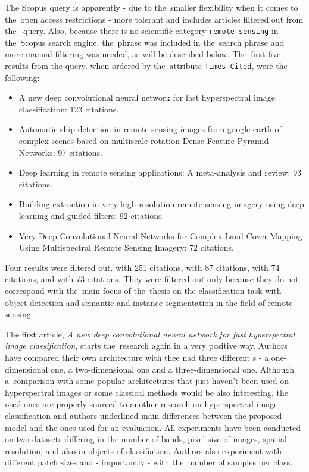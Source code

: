 \noindent The Scopus query is apparently - due to the~smaller flexibility when it comes to the~open access restrictions - more tolerant and includes articles filtered out from the~ query. Also, because there is no scientific category \verb|remote sensing| in the~Scopus search engine, the~phrase was included in the~search phrase and more manual filtering was needed, as will be described below. The~first five results from the query, when ordered by the~attribute \verb|Times Cited|, were the following:

\begin{itemize}
	\item A new deep convolutional neural network for fast hyperspectral image classification: 123 citations.  \cite{cnn-hs-class}
	\item Automatic ship detection in remote sensing images from google earth of complex scenes based on multiscale rotation Dense Feature Pyramid Networks: 97 citations. \cite{ship-rdfpn}
	\item Deep learning in remote sensing applications: A meta-analysis and review: 93 citations. \cite{dl-remote-sensing-review}
	\item Building extraction in very high resolution remote sensing imagery using deep learning and guided filters: 92 citations. \cite{vhr-building}
	\item Very Deep Convolutional Neural Networks for Complex Land Cover Mapping Using Multispectral Remote Sensing Imagery: 72 citations. \cite{very-deep-cnn-lc}
\end{itemize}

Four results were filtered out. \cite{dl-for-cv} with 251 citations, \cite{dl-lungs} with 87 citations, \cite{maoxian-landslide} with 74 citations, and \cite{state-of-the-art-dl} with 73 citations. They were filtered out only because they do not correspond with the~main focus of the~thesis on the classification task with object detection and semantic and instance segmentation in the field of remote sensing. 

The first article, \textit{A new deep convolutional neural network for fast hyperspectral image classification}, starts the~research again in a very positive way. Authors have compared their own architecture with thee  nad three different s - a one-dimensional one, a two-dimensional one and a three-dimensional one. Although a~comparison with some popular architectures that just haven't been used on hyperspectral images or some classical  methods would be also interesting, the used ones are properly sourced to another research on hyperspectral image classification and authors underlined main differences between the proposed model and the ones used for an evaluation. All experiments have been conducted on two datasets differing in the number of bands, pixel size of images, spatial resolution, and also in objects of classifiation. Authors also experiment with different patch sizes and - importantly - with the~number of samples per class.

